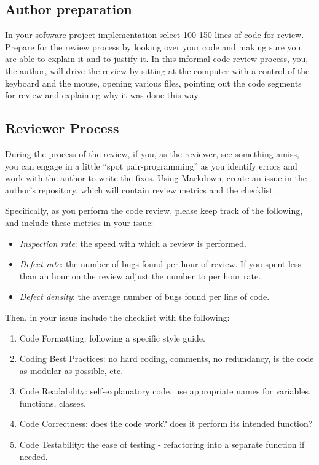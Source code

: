 \documentclass[11pt]{article}
\begin{document}
\subsection*{Author preparation}
In your software project implementation select 100-150 lines of code for review. Prepare for the review process by looking over your code and making sure you are able to explain it and to justify it. In this informal code review process, you, the author, will drive the review by sitting at the computer with a control of the keyboard and the mouse, opening various files, pointing out the code segments for review and
explaining why it was done this way. 

\subsection*{Reviewer Process}

During the process of the review, if you, as the reviewer, see something
amiss, you can engage in a little ``spot pair-programming''  as you identify errors and work with the author to write the fixes. Using Markdown, create an issue in the author's repository, which will contain review metrics and the checklist. 

\noindent Specifically, as you perform the code review, please keep track of the following, and include these metrics in your issue:
\begin{itemize}
	\item \emph{Inspection rate}: the speed with which a review is performed.
	\item \emph{Defect rate}: the number of bugs found per hour of review. If you spent less than an hour on the review adjust the number to per hour rate.
	\item \emph{Defect density}: the average number of bugs found per line of code.
\end{itemize}


\noindent Then, in your issue include the checklist with the following:
\begin{enumerate}

	\item Code Formatting: following a specific style guide.
	\item Coding Best Practices: no hard coding, comments, no redundancy, is the code as modular as possible, etc.
	\item Code Readability: self-explanatory code, use appropriate names for variables, functions, classes.
	\item Code Correctness: does the code work? does it perform its intended function?
	\item Code Testability: the ease of testing - refactoring into a separate function if needed.
\end{enumerate}
\end{document}
